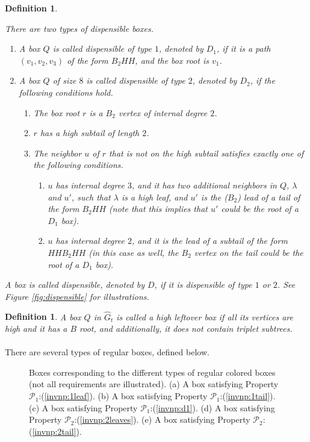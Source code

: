 \documentclass[11pt]{article}
\def\dnsitem{\vspace{-7pt}\item}
\def\dnssubitem{\vspace{-5pt}\item}
\newtheorem{definition}[theorem]{Definition}
\theoremstyle{definition}
\def\propbr{\mathcal{P}_1}
\def\propbbr{\mathcal{P}_2}
\begin{document}
\begin{definition}
\label{def:dispensible}

There are two types of dispensible boxes.
\begin{enumerate}
	\dnsitem A box $Q$ is called \emph{dispensible of type $1$}, denoted by $D_1$, if it is a path $(v_1, v_2, v_3)$ of the form $B_2HH$, and the box root is $v_1$.

	\dnsitem A box $Q$ of size $8$ is called \emph{dispensible of type $2$}, denoted by $D_2$, if the following conditions hold.
	\begin{enumerate}
		\dnsitem The box root $r$ is a $B_2$ vertex of internal degree $2$.
		\dnssubitem $r$ has a high subtail of length $2$.
		\dnssubitem The neighbor $u$ of $r$ that is not on the high subtail satisfies exactly one of the following conditions.
		\begin{enumerate}
			\dnsitem 
			\label{def:dispensible:d2:p1}
			$u$ has internal degree $3$, and it has two additional neighbors in $Q$, $\lambda$ and $u'$, such that $\lambda$ is a high leaf, 
			and $u'$ is the ($B_2$) lead of a tail of the form $B_2HH$ (note that this implies that $u'$ could be the root of a $D_1$ box).
			\dnssubitem 
			\label{def:dispensible:d2:p2}
			$u$ has internal degree $2$, and it is the lead of a subtail of the form $HHB_2HH$ (in this case as well, the $B_2$ vertex on the tail could be the root of a $D_1$ box).
		\end{enumerate}
	\end{enumerate}
\end{enumerate}
 
A box is called \emph{dispensible}, denoted by $D$, if it is dispensible of type $1$ or $2$.
See Figure \ref{fig:dispensible} for illustrations.
\end{definition}

\begin{definition}
A box $Q$ in $\hat{G}_t$ is called a \emph{high leftover box} if all its vertices are high and it has a $B$ root,
and additionally, it does not contain triplet subtrees. 
\end{definition}

\paragraph{}
There are several types of regular boxes, defined below.

\begin{figure}[thbp]
  \caption{\sf Boxes corresponding to the different types of regular colored boxes (not all requirements are illustrated).
		(a) A box satisfying Property $\propbr$:(\ref{invnp:1leaf}).
		(b) A box satisfying Property $\propbr$:(\ref{invnp:1tail}).
		(c) A box satisfying Property $\propbr$:(\ref{invnp:d1}).
		(d) A box satisfying Property $\propbbr$:(\ref{invnp:2leaves}).
		(e) A box satisfying Property $\propbbr$:(\ref{invnp:2tail}).}
  \medskip
  \centering
  \label{fig:regular_complex}
\end{figure}
\end{document}
